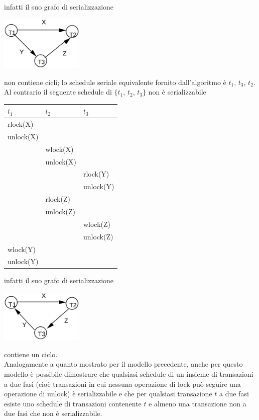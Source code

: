 infatti il suo grafo di serializzazione

\begin{center}
 \includegraphics[width=150px]{grafo3.eps}
\end{center}

non contiene cicli; lo schedule seriale equivalente fornito dall'algoritmo è $t_1$, $t_3$, $t_2$. Al contrario il
seguente schedule di $\{t_1$, $t_2$, $t_3\}$ non è serializzabile

\begin{center}
\begin{longtable}{|l|l|l|}
 \hline
 $t_1$ & $t_2$ & $t_3$\\
 \hline
 rlock(X)& &\\
 unlock(X)& &\\
 & wlock(X)& \\
 & unlock(X)& \\
 & & rlock(Y) \\
 & & unlock(Y)\\
 & rlock(Z)& \\
 & unlock(Z)& \\
 & &wlock(Z)\\
 & &unlock(Z)\\
 wlock(Y) & &\\
 unlock(Y) & &\\
\hline
 \end{longtable}
\end{center}

infatti il suo grafo di serializzazione

\begin{center}
 \includegraphics[width=150px]{img_6_3_2.eps}
\end{center}
contiene un ciclo.\\

Analogamente a quanto mostrato per il modello precedente, anche per questo modello è possibile
dimostrare che qualsiasi schedule di un insieme di transazioni a due fasi (cioè transazioni in cui
nessuna operazione di lock può seguire una operazione di unlock) è serializzabile e che per qualsiasi
transazione $t$ a due fasi esiste uno schedule di transazioni contenente $t$ e almeno una transazione
non a due fasi che non è serializzabile.

